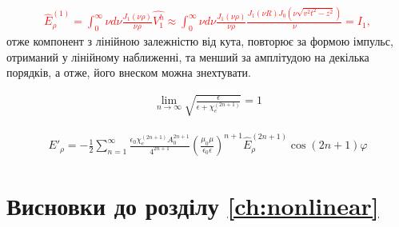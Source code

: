 \textcolor{red} { \begin{equation} \begin{aligned} \label{eq:erho_norm}
\hat{E}_\rho^{(1)} = \int_0^\infty \nu d \nu 
\frac{J_1(\nu \rho)}{\nu \rho} \hat{V_1^h} \approx
\int_0^\infty \nu d \nu \frac{J_1(\nu \rho)}{\nu \rho} 
\frac{J_1(\nu R) J_0(\nu \sqrt{v^2t^2-z^2})}{\nu} = I_1,
\end{aligned} \end{equation} }
%
отже компонент з лінійною залежністю від кута, повторює за формою 
імпульс, отриманий у лінійному наближенні, та менший за амплітудою на 
декілька порядків, а отже, його внеском можна знехтувати.

\begin{equation*} \begin{aligned}
\lim_{n \to \infty} 
\sqrt{ \frac{\epsilon}{ \epsilon + \chi_e^{(2n+1)}} } = 1
\end{aligned} \end{equation*}



\begin{equation*} \begin{aligned}
E'_\rho = - \frac{1}{2} \sum_{n=1}^{\infty} 
\frac{\epsilon_0 \chi_e^{(2n+1)} A_0^{2n+1} }{ 4^{2n+1} }
\left( \frac{\mu_0 \mu}{\epsilon_0 \epsilon} \right)^{n+1}
\hat{E}_\rho^{(2n+1)} \cos (2n + 1) \varphi
\end{aligned} \end{equation*}

\section*{Висновки до розділу \ref{ch:nonlinear}}

